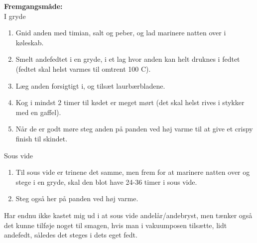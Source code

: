 \documentclass{book}
\begin{document}
\begin{minipage}[t]{0.5\textwidth}
\textbf{Fremgangsmåde:}
\\ I gryde 
\begin{enumerate}
    \item Gnid anden med timian, salt og peber, og lad marinere natten over i køleskab.
    \item Smelt andefedtet i en gryde, i et lag hvor anden kan helt druknes i fedtet (fedtet skal helst varmes til omtrent 100 \degree C).
    \item Læg anden forsigtigt i, og tilsæt laurbærbladene. 
    \item Kog i mindst 2 timer til kødet er meget mørt (det skal helst rives i stykker med en gaffel).
    \item Når de er godt møre steg anden på panden ved høj varme til at give et crispy finish til skindet.
\end{enumerate}
Sous vide
\begin{enumerate}
    \item Til sous vide er trinene det samme, men frem for at marinere natten over og stege i en gryde, skal den blot have 24-36 timer i sous vide.
    \item Steg også her på panden ved høj varme. 
\end{enumerate}
\end{minipage}
Har endnu ikke kastet mig ud i at sous vide andelår/andebryst, men tænker også det kunne tilføje noget til smagen, hvis man i vakuumposen tilsætte, lidt andefedt, således det steges i dets eget fedt.
\end{document}
